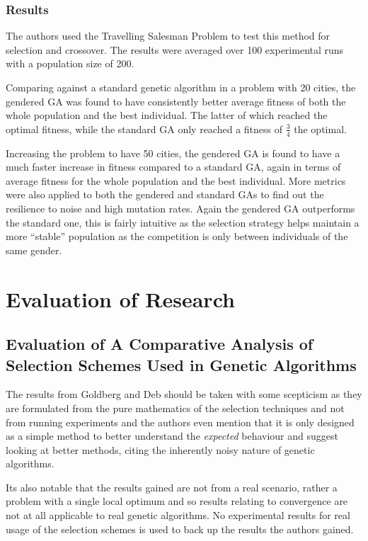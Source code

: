 \documentclass[10pt, a4paper]{article}
\begin{document}
\subsubsection{Results}
The authors used the Travelling Salesman Problem to test this method for
selection and crossover. The results were averaged over 100 experimental runs
with a population size of 200.

Comparing against a standard genetic algorithm in a problem with 20 cities, the
gendered GA was found to have consistently better average fitness of both the
whole population and the best individual. The latter of which reached the
optimal fitness, while the standard GA only reached a fitness of $\frac{3}{4}$
the optimal.

Increasing the problem to have 50 cities, the gendered GA is found to have a
much faster increase in fitness compared to a standard GA, again in terms of
average fitness for the whole population and the best individual. More metrics
were also applied to both the gendered and standard GAs to find out the
resilience to noise and high mutation rates. Again the gendered GA outperforms
the standard one, this is fairly intuitive as the selection strategy helps
maintain a more ``stable'' population as the competition is only between
individuals of the same gender.


\newpage
\section{Evaluation of Research}

\subsection{Evaluation of A Comparative Analysis of Selection Schemes Used in Genetic Algorithms} 
The results from Goldberg and Deb\cite{Goldberg1991Comparative} should be taken
with some scepticism as they are formulated from the pure mathematics of the 
selection techniques and not from running experiments and the authors even 
mention that it is only designed as a simple method to better understand the 
\textit{expected} behaviour and suggest looking at better methods, citing the 
inherently noisy nature of genetic algorithms.

Its also notable that the results gained are not from a real scenario, rather a
problem with a single local optimum and so results relating to convergence are
not at all applicable to real genetic algorithms. No experimental results for
real usage of the selection schemes is used to back up the results the authors
gained.
\end{document}
